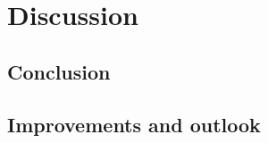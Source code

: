 \chapter{Discussion}
\label{cha:Discussion}

\section{Conclusion}

\section{Improvements and outlook}
